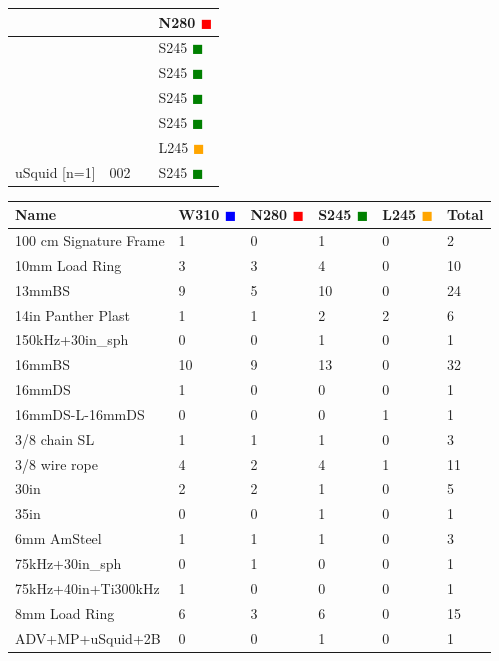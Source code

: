 \documentclass{article}
\begin{document}
\begin{tabularx}{\linewidth}{|X|l|l|X|}
 &  &  & N280 \textcolor{red}{$\blacksquare$} \\ \hline
 &  &  & S245 \textcolor{green}{$\blacksquare$} \\ \hline
 &  &  & S245 \textcolor{green}{$\blacksquare$} \\ \hline
 &  &  & S245 \textcolor{green}{$\blacksquare$} \\ \hline
 &  &  & S245 \textcolor{green}{$\blacksquare$} \\ \hline
 &  &  & L245 \textcolor{orange}{$\blacksquare$} \\ \hline
uSquid [n=1] & 002 &  & S245 \textcolor{green}{$\blacksquare$} \\ \hline
\end{tabularx}
\begin{tabularx}{\linewidth}{|l|l|l|l|l|l|}
\caption{All : Total count of each element}\\
\hline
\textbf{Name} & \textbf{W310 \textcolor{blue}{$\blacksquare$}} & \textbf{N280 \textcolor{red}{$\blacksquare$}} & \textbf{S245 \textcolor{green}{$\blacksquare$}} & \textbf{L245 \textcolor{orange}{$\blacksquare$}} & \textbf{Total} \\
\hline
100 cm Signature Frame & 1 & 0 & 1 & 0 & 2 \\ \hline
10mm Load Ring & 3 & 3 & 4 & 0 & 10 \\ \hline
13mmBS & 9 & 5 & 10 & 0 & 24 \\ \hline
14in Panther Plast & 1 & 1 & 2 & 2 & 6 \\ \hline
150kHz+30in\_sph & 0 & 0 & 1 & 0 & 1 \\ \hline
16mmBS & 10 & 9 & 13 & 0 & 32 \\ \hline
16mmDS & 1 & 0 & 0 & 0 & 1 \\ \hline
16mmDS-L-16mmDS & 0 & 0 & 0 & 1 & 1 \\ \hline
3/8 chain SL & 1 & 1 & 1 & 0 & 3 \\ \hline
3/8 wire rope & 4 & 2 & 4 & 1 & 11 \\ \hline
30in & 2 & 2 & 1 & 0 & 5 \\ \hline
35in & 0 & 0 & 1 & 0 & 1 \\ \hline
6mm AmSteel & 1 & 1 & 1 & 0 & 3 \\ \hline
75kHz+30in\_sph & 0 & 1 & 0 & 0 & 1 \\ \hline
75kHz+40in+Ti300kHz & 1 & 0 & 0 & 0 & 1 \\ \hline
8mm Load Ring & 6 & 3 & 6 & 0 & 15 \\ \hline
ADV+MP+uSquid+2B & 0 & 0 & 1 & 0 & 1 \\ \hline

\end{tabularx}
\end{document}
